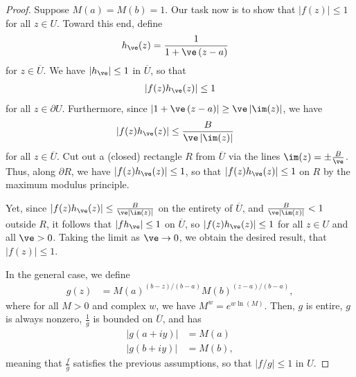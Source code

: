 \documentclass[10pt]{mypackage}
\begin{document}
\begin{proof}
  Suppose $M(a) = M(b) = 1$. Our task now is to show that $\left\vert f(z) \right\vert \leq 1$ for all $z\in U$. Toward this end, define
  \begin{align*}
    h_{\ve}(z) &= \frac{1}{1 + \ve\left( z-a \right)}
  \end{align*}
  for $z\in \overline{U}$. We have $\left\vert h_{\ve} \right\vert \leq 1$ in $ \overline{U} $, so that
  \begin{align*}
    \left\vert f(z)h_{\ve}(z) \right\vert \leq 1
  \end{align*}
  for all $z\in \partial U$. Furthermore, since $\left\vert 1 + \ve\left( z-a \right) \right\vert \geq \ve\left\vert \im(z) \right\vert$, we have
  \begin{align*}
    \left\vert f(z)h_{\ve}(z) \right\vert &\leq \frac{B}{\ve\left\vert \im(z) \right\vert}
  \end{align*}
  for all $z\in \overline{U}$. Cut out a (closed) rectangle $R$ from $ \overline{U} $ via the lines $\im(z) = \pm \frac{B}{\ve}$. Thus, along $\partial R$, we have $\left\vert f(z)h_{\ve}(z) \right\vert \leq 1$, so that $\left\vert f(z)h_{\ve}(z) \right\vert \leq 1$ on $R$ by the maximum modulus principle.%

  Yet, since $\left\vert f(z)h_{\ve}(z) \right\vert \leq \frac{B}{\ve\left\vert \im(z) \right\vert}$ on the entirety of $ \overline{U} $, and $ \frac{B}{\ve\left\vert \im(z) \right\vert} < 1 $ outside $R$, it follows that $\left\vert fh_{\ve} \right\vert\leq 1$ on $ \overline{U} $, so $ \left\vert f(z)h_{\ve}(z) \right\vert \leq 1 $ for all $z\in U$ and all $\ve > 0$. Taking the limit as $\ve \rightarrow 0$, we obtain the desired result, that $\left\vert f(z) \right\vert \leq 1$.%

  In the general case, we define
  \begin{align*}
    g(z) &= M(a)^{(b-z)/(b-a)}M(b)^{(z-a)/(b-a)},
  \end{align*}
  where for all $M > 0$ and complex $w$, we have $M^{w} = e^{w\ln(M)}$. Then, $g$ is entire, $g$ is always nonzero, $\frac{1}{g}$ is bounded on $ \overline{U} $, and has
  \begin{align*}
    \left\vert g\left( a + iy \right) \right\vert &= M(a)\\
    \left\vert g\left( b + iy \right) \right\vert &= M(b),
  \end{align*}
  meaning that $\frac{f}{g}$ satisfies the previous assumptions, so that $ \left\vert f/g \right\vert \leq 1 $ in $U$.
\end{proof}
\end{document}
